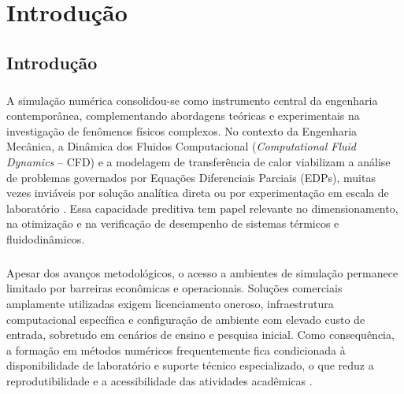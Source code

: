 \chapter{Introdução}
\label{cap1}


\section{Introdução}
\label{sec:introducao}

\paragraph{}A simulação numérica consolidou-se como instrumento central da engenharia contemporânea, complementando abordagens teóricas e experimentais na investigação de fenômenos físicos complexos. No contexto da Engenharia Mecânica, a Dinâmica dos Fluidos Computacional (\textit{Computational Fluid Dynamics} -- CFD) e a modelagem de transferência de calor viabilizam a análise de problemas governados por Equações Diferenciais Parciais (EDPs), muitas vezes inviáveis por solução analítica direta ou por experimentação em escala de laboratório \cite{Maliska2004}. Essa capacidade preditiva tem papel relevante no dimensionamento, na otimização e na verificação de desempenho de sistemas térmicos e fluidodinâmicos.

\paragraph{}Apesar dos avanços metodológicos, o acesso a ambientes de simulação permanece limitado por barreiras econômicas e operacionais. Soluções comerciais amplamente utilizadas exigem licenciamento oneroso, infraestrutura computacional específica e configuração de ambiente com elevado custo de entrada, sobretudo em cenários de ensino e pesquisa inicial. Como consequência, a formação em métodos numéricos frequentemente fica condicionada à disponibilidade de laboratório e suporte técnico especializado, o que reduz a reprodutibilidade e a acessibilidade das atividades acadêmicas \cite{Anjos2024}.

